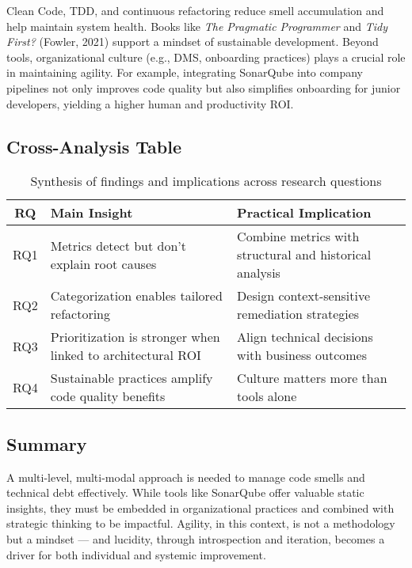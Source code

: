 Clean Code, TDD, and continuous refactoring reduce smell accumulation and help maintain system health. Books like \textit{The Pragmatic Programmer} and \textit{Tidy First?} (Fowler, 2021) support a mindset of sustainable development. 
Beyond tools, organizational culture (e.g., DMS, onboarding practices) plays a crucial role in maintaining agility. 
For example, integrating SonarQube into company pipelines not only improves code quality but also simplifies onboarding for junior developers, yielding a higher human and productivity ROI.

\subsection{Cross-Analysis Table}

\begin{table}[H]
\centering
\begin{tabular}{|c|p{6cm}|p{6cm}|}
\hline
\textbf{RQ} & \textbf{Main Insight} & \textbf{Practical Implication} \\
\hline
RQ1 & Metrics detect but don't explain root causes & Combine metrics with structural and historical analysis \\
\hline
RQ2 & Categorization enables tailored refactoring & Design context-sensitive remediation strategies \\
\hline
RQ3 & Prioritization is stronger when linked to architectural ROI & Align technical decisions with business outcomes \\
\hline
RQ4 & Sustainable practices amplify code quality benefits & Culture matters more than tools alone \\
\hline
\end{tabular}
\caption{Synthesis of findings and implications across research questions}
\end{table}

\subsection{Summary}

A multi-level, multi-modal approach is needed to manage code smells and technical debt effectively. 
While tools like SonarQube offer valuable static insights, they must be embedded in organizational practices and combined with strategic thinking to be impactful. 
Agility, in this context, is not a methodology but a mindset — and lucidity, through introspection and iteration, becomes a driver for both individual and systemic improvement.
